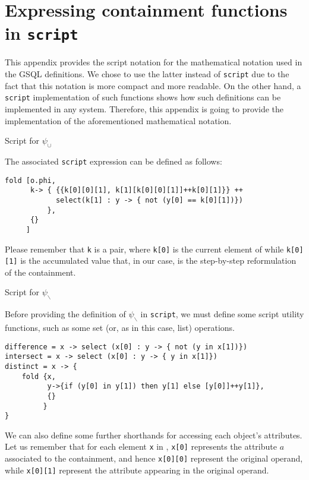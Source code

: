 \chapter{Expressing containment functions in \texttt{script}}\label{app:scriptnote}

This appendix provides the script notation for the mathematical notation used in the GSQL definitions. We chose to use the latter instead of \texttt{script} due to the fact that this notation is more compact and more readable. On the other hand, a \texttt{script} implementation of such functions shows how such definitions can be implemented in any system. Therefore, this appendix is going to provide the implementation of the aforementioned mathematical notation.

{\par\LARGE Script for $\psi_\cup$\par}

The associated \texttt{script} expression can be defined as follows: 
\begin{lstlisting}[language=script]
fold [o.phi,
      k-> { {{k[0][0][1], k[1][k[0][0][1]]++k[0][1]}} ++ 
            select(k[1] : y -> { not (y[0] == k[0][1])})
          },
      {}
     ] 
\end{lstlisting}
Please remember that \texttt{k} is a pair, where \texttt{k[0]} is the current element of  while \texttt{k[0][1]} is the accumulated value that, in our case, is the step-by-step reformulation of the containment.

{\par\LARGE Script for $\psi_\backslash$\par}

Before providing the definition of $\psi_\backslash$ in \texttt{script}, we must define some script utility functions, such as some set (or, as in this case, list) operations. 

\begin{lstlisting}[language=script]
difference = x -> select (x[0] : y -> { not (y in x[1])})
intersect = x -> select (x[0] : y -> { y in x[1]})
distinct = x -> {
	fold {x,
	      y->{if (y[0] in y[1]) then y[1] else [y[0]]++y[1]},
	      {}
	     }
}
\end{lstlisting}

We can also define some further shorthands for accessing each object's attributes. Let us remember that for each element \texttt{x} in , \texttt{x[0]} represents the attribute $a$ associated to the containment, and hence \texttt{x[0][0]} represent the original operand, while \texttt{x[0][1]} represent the attribute appearing in the original operand. 

